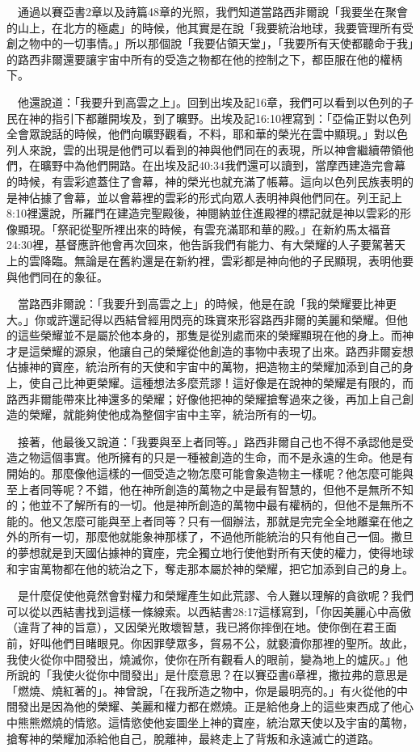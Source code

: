 \documentclass{book}
\begin{document}
　通過以賽亞書2章以及詩篇48章的光照，我們知道當路西非爾說「我要坐在聚會的山上，在北方的極處」的時候，他其實是在說「我要統治地球，我要管理所有受創之物中的一切事情。」所以那個說「我要佔領天堂」，「我要所有天使都聽命于我」的路西非爾還要讓宇宙中所有的受造之物都在他的控制之下，都臣服在他的權柄下。

　他還說道：「我要升到高雲之上」。回到出埃及記16章，我們可以看到以色列的子民在神的指引下都離開埃及，到了曠野。出埃及記16:10裡寫到：「亞倫正對以色列全會眾說話的時候，他們向曠野觀看，不料，耶和華的榮光在雲中顯現。」對以色列人來說，雲的出現是他們可以看到的神與他們同在的表現，所以神會繼續帶領他們，在曠野中為他們開路。在出埃及記40:34我們還可以讀到，當摩西建造完會幕的時候，有雲彩遮蓋住了會幕，神的榮光也就充滿了帳幕。這向以色列民族表明的是神佔據了會幕，並以會幕裡的雲彩的形式向眾人表明神與他們同在。列王記上8:10裡還說，所羅門在建造完聖殿後，神閱納並住進殿裡的標記就是神以雲彩的形像顯現。「祭祀從聖所裡出來的時候，有雲充滿耶和華的殿。」在新約馬太福音24:30裡，基督應許他會再次回來，他告訴我們有能力、有大榮耀的人子要駕著天上的雲降臨。無論是在舊約還是在新約裡，雲彩都是神向他的子民顯現，表明他要與他們同在的象征。

　當路西非爾說：「我要升到高雲之上」的時候，他是在說「我的榮耀要比神更大。」你或許還記得以西結曾經用閃亮的珠寶來形容路西非爾的美麗和榮耀。但他的這些榮耀並不是屬於他本身的，那隻是從別處而來的榮耀顯現在他的身上。而神才是這榮耀的源泉，他讓自己的榮耀從他創造的事物中表現了出來。路西非爾妄想佔據神的寶座，統治所有的天使和宇宙中的萬物，把造物主的榮耀加添到自己的身上，使自己比神更榮耀。這種想法多麼荒謬！這好像是在說神的榮耀是有限的，而路西非爾能帶來比神還多的榮耀；好像他把神的榮耀搶奪過來之後，再加上自己創造的榮耀，就能夠使他成為整個宇宙中主宰，統治所有的一切。

　接著，他最後又說道：「我要與至上者同等。」路西非爾自己也不得不承認他是受造之物這個事實。他所擁有的只是一種被創造的生命，而不是永遠的生命。他是有開始的。那麼像他這樣的一個受造之物怎麼可能會象造物主一樣呢？他怎麼可能與至上者同等呢？不錯，他在神所創造的萬物之中是最有智慧的，但他不是無所不知的；他並不了解所有的一切。他是神所創造的萬物中最有權柄的，但他不是無所不能的。他又怎麼可能與至上者同等？只有一個辦法，那就是完完全全地離棄在他之外的所有一切，那麼他就能象神那樣了，不過他所能統治的只有他自己一個。撒旦的夢想就是到天國佔據神的寶座，完全獨立地行使他對所有天使的權力，使得地球和宇宙萬物都在他的統治之下，奪走那本屬於神的榮耀，把它加添到自己的身上。

　是什麼促使他竟然會對權力和榮耀產生如此荒謬、令人難以理解的貪欲呢？我們可以從以西結書找到這樣一條線索。以西結書28:17這樣寫到，「你因美麗心中高傲（違背了神的旨意），又因榮光敗壞智慧，我已將你摔倒在地。使你倒在君王面前，好叫他們目睹眼見。你因罪孽眾多，貿易不公，就褻瀆你那裡的聖所。故此，我使火從你中間發出，燒滅你，使你在所有觀看人的眼前，變為地上的爐灰。」他所說的「我使火從你中間發出」是什麼意思？在以賽亞書6章裡，撒拉弗的意思是「燃燒、燒紅著的」。神曾說，「在我所造之物中，你是最明亮的。」有火從他的中間發出是因為他的榮耀、美麗和權力都在燃燒。正是給他身上的這些東西成了他心中熊熊燃燒的情慾。這情慾使他妄圖坐上神的寶座，統治眾天使以及宇宙的萬物，搶奪神的榮耀加添給他自己，脫離神，最終走上了背叛和永遠滅亡的道路。
\end{document}
